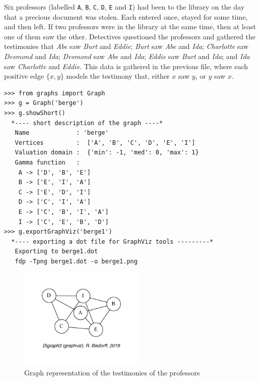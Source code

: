 Six professors (labelled \texttt{A}, \texttt{B}, \texttt{C}, \texttt{D}, \texttt{E} and \texttt{I}) had been to the library on the day that a precious document was stolen. Each entered once, stayed for some time, and then left. If two professors were in the library at the same time, then at least one of them saw the other. Detectives questioned the professors and gathered the testimonies that \emph{Abe} saw \emph{Burt} and \emph{Eddie}; \emph{Burt} saw \emph{Abe} and \emph{Ida}; \emph{Charlotte} saw \emph{Desmond} and \emph{Ida}; \emph{Desmond} saw \emph{Abe} and \emph{Ida}; \emph{Eddie} saw \emph{Burt} and \emph{Ida}; and \emph{Ida} saw \emph{Charlotte} and \emph{Eddie}. This data is gathered in the previous file, where each positive edge $\{x,y\}$ models the testimony that, either $x$ saw $y$, or $y$ saw $x$.
\begin{lstlisting}
>>> from graphs import Graph
>>> g = Graph('berge')
>>> g.showShort()
  *---- short description of the graph ----*
   Name             : 'berge'
   Vertices         :  ['A', 'B', 'C', 'D', 'E', 'I']
   Valuation domain :  {'min': -1, 'med': 0, 'max': 1}
   Gamma function   : 
    A -> ['D', 'B', 'E']
    B -> ['E', 'I', 'A']
    C -> ['E', 'D', 'I']
    D -> ['C', 'I', 'A']
    E -> ['C', 'B', 'I', 'A']
    I -> ['C', 'E', 'B', 'D']
>>> g.exportGraphViz('berge1')
  *---- exporting a dot file for GraphViz tools ---------*
   Exporting to berge1.dot
   fdp -Tpng berge1.dot -o berge1.png
\end{lstlisting}
\begin{figure}[ht]
\sidecaption[t]
\includegraphics[width=6cm]{Figures/23-2-berge1.pdf}
\caption{Graph representation of the testimonies of the professors} 
\label{fig:23.2}       %
\end{figure}

